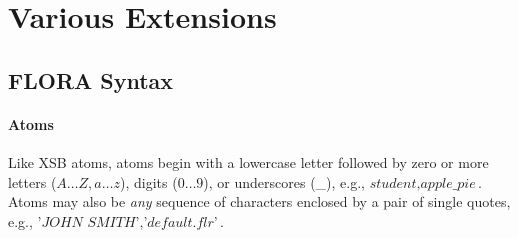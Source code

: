 \documentclass[11pt]{report}
\begin{document}
\section{Various Extensions}

\subsection{FLORA Syntax}

\paragraph{Atoms}

Like XSB atoms, \FLORA atoms begin with a lowercase letter followed by zero or more letters
($A \ldots Z, a \ldots z$), digits ($0 \ldots 9$), or underscores (\_), e.g.,
$\textit{student}, \textit{apple\_pie}$. Atoms may also be \emph{any} sequence
of characters enclosed by a pair of single quotes, e.g.,
$\textit{'JOHN SMITH'},\textit{'default.flr'}$.
\end{document}
